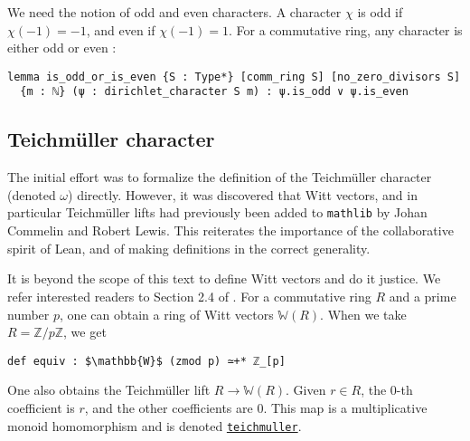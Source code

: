 \documentclass[a4paper,UKenglish,cleveref, autoref, thm-restate]{lipics-v2021}
\newcommand{\lean}[1]{\texttt{#1}\xspace} %
\begin{document}
We need the notion of odd and even characters. A character $\chi$ is odd if $\chi (-1) = -1$, and 
even if $\chi (-1) = 1$. For a commutative ring, any character is either odd or even : 
\begin{lstlisting}
lemma is_odd_or_is_even {S : Type*} [comm_ring S] [no_zero_divisors S] 
  {m : ℕ} (ψ : dirichlet_character S m) : ψ.is_odd ∨ ψ.is_even
\end{lstlisting}
\subsection{Teichmüller character}
The initial effort was to formalize the definition of the Teichmüller character (denoted $\omega$) directly. 
However, it was discovered that Witt vectors, and in particular Teichmüller lifts had previously 
been added to \lean{mathlib} by Johan Commelin and Robert Lewis. This reiterates the importance 
of the collaborative spirit of Lean, and of making definitions in the correct generality. 

It is beyond the scope of this text to define Witt vectors and do it justice. We refer interested readers to 
Section 2.4 of \cite{witt}. For a commutative ring $R$ and a prime number $p$, one can obtain a ring of Witt vectors $\mathbb{W}(R)$.
When we take $R = \mathbb{Z}/p \mathbb{Z}$, we get 
\begin{lstlisting}
def equiv : $\mathbb{W}$ (zmod p) ≃+* ℤ_[p]
\end{lstlisting}
One also obtains the Teichmüller lift $R \to \mathbb{W} (R)$. Given $r \in R$, 
the 0-th coefficient is $r$, and the other coefficients are 0. This map is a 
multiplicative monoid homomorphism and is denoted 
\href{https://leanprover-community.github.io/mathlib_docs/ring_theory/witt_vector/teichmuller.html#witt_vector.teichmuller}{\lean{teichmuller}}. 
\end{document}
